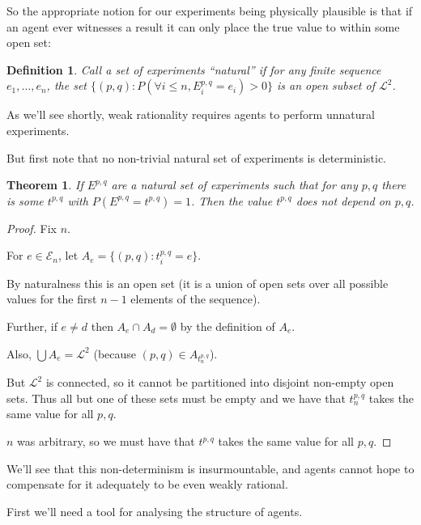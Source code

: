 \documentclass[a4paper]{book}
\newtheorem{definition}{Definition}[section]
\newtheorem{theorem}{Theorem}[section]
\begin{document}
So the appropriate notion for our experiments being physically plausible
is that if an agent ever witnesses a result it can only place the true
value to within some open set:

\begin{definition}
Call a set of experiments ``natural'' if for any finite sequence
$e_1, \ldots, e_n$,
the set $\{(p, q): P(\forall i \leq n, E^{p, q}_i = e_i) > 0\}$
is an open subset of $\mathcal{L}^2$.
\end{definition}

As we'll see shortly, weak rationality requires agents to perform
unnatural experiments.

But first note that no non-trivial natural set of experiments is
deterministic.

\begin{theorem}
If $E^{p, q}$
are a natural set of experiments such that for any $p, q$
there is some $t^{p, q}$
with $P(E^{p, q} = t^{p, q}) = 1$.
Then the value $t^{p, q}$
does not depend on $p, q$.
\end{theorem}

\begin{proof}

Fix $n$.

For $e \in \mathcal{E}_n$, let $A_e = \{(p, q): t^{p, q}_i = e\}$.

By naturalness this is an open set (it is a union of open sets over
all possible values for the first $n - 1$ elements of the sequence).

Further, if $e \neq d$ then $A_e \cap A_d = \emptyset$
by the definition of $A_e$.

Also, $\bigcup A_e = \mathcal{L}^2$
(because $(p, q) \in A_{t^{p, q}_n}$).

But $\mathcal{L}^2$
is connected, so it cannot be partitioned into disjoint non-empty
open sets. Thus all but one of these sets must be empty and we have
that $t^{p, q}_n$
takes the same value for all $p, q$.

$n$
was arbitrary, so we must have that $t^{p, q}$
takes the same value for all $p, q$.
\end{proof}

We'll see that this non-determinism is insurmountable, and agents cannot
hope to compensate for it adequately to be even weakly rational.

First we'll need a tool for analysing the structure of agents.
\end{document}
